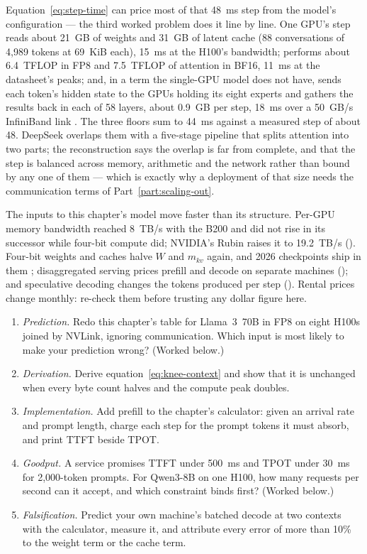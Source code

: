 Equation~\eqref{eq:step-time} can price most of that 48~ms step from the model's
configuration --- the third worked problem does it line by line. One GPU's step
reads about 21~GB of weights and 31~GB of latent cache (88 conversations of 4,989
tokens at 69~KiB each), 15~ms at the H100's bandwidth; performs about 6.4~TFLOP
in FP8 and 7.5~TFLOP of attention in BF16, 11~ms at the datasheet's peaks; and,
in a term the single-GPU model does not have, sends each token's hidden state to
the GPUs holding its eight experts and gathers the results back in each of 58
layers, about 0.9~GB per step, 18~ms over a 50~GB/s InfiniBand link
\cite{deepseek2024v3}. The three floors sum to 44~ms against a measured step of
about 48. DeepSeek overlaps them with a five-stage pipeline that splits
attention into two parts; the reconstruction says the overlap is far from
complete, and that the step is balanced across memory, arithmetic and the
network rather than bound by any one of them --- which is exactly why a
deployment of that size needs the communication terms of
Part~\ref{part:scaling-out}.


The inputs to this chapter's model move faster than its structure. Per-GPU
memory bandwidth reached 8~TB/s with the B200 and did not rise in its successor
while four-bit compute did; NVIDIA's Rubin raises it to 19.2~TB/s
\cite{nvidia2026verarubin} (). Four-bit weights and caches halve
$W$ and $m_{kv}$ again, and 2026 checkpoints ship in them
\cite{moonshot2026kimik3,openai2025gptoss}; disaggregated serving prices
prefill and decode on separate machines (); and
speculative decoding changes the tokens produced per step
(). Rental prices change monthly: re-check them
before trusting any dollar figure here.

\ExercisesSection

\begin{enumerate}
\item \emph{Prediction.} Redo this chapter's table for Llama~3~70B in FP8 on
eight H100s joined by NVLink, ignoring communication. Which input is most
likely to make your prediction wrong? (Worked below.)
\item \emph{Derivation.} Derive equation~\eqref{eq:knee-context} and show that
it is unchanged when every byte count halves and the compute peak doubles.
\item \emph{Implementation.} Add prefill to the chapter's calculator: given an
arrival rate and prompt length, charge each step for the prompt tokens it must
absorb, and print TTFT beside TPOT.
\item \emph{Goodput.} A service promises TTFT under 500~ms and TPOT under
30~ms for 2,000-token prompts. For Qwen3-8B on one H100, how many requests per
second can it accept, and which constraint binds first? (Worked below.)
\item \emph{Falsification.} Predict your own machine's batched decode at two
contexts with the calculator, measure it, and attribute every error of more than
10\% to the weight term or the cache term.
\end{enumerate}


